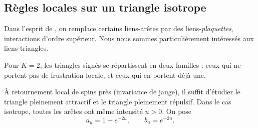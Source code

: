 


\subsection{Règles locales sur un triangle isotrope}

Dans l'esprit de \KBD{} \cite{KBD1992}, on remplace certains liens-arêtes par des liens-\emph{plaquettes}, interactions d'ordre supérieur. 
Nous nous sommes particulièrement intéressés aux liens-triangles.

Pour $K=2$, les triangles signés se répartissent en deux familles : ceux qui ne portent pas de frustration locale, et ceux qui en portent déjà une. 

À retournement local de spins près (invariance de jauge), il suffit d'étudier le triangle pleinement attractif et le triangle pleinement répulsif. 
Dans le cas isotrope, toutes les arêtes ont même intensité $u>0$. On pose
\begin{equation}
    a_u=1-e^{-2u},
    \qquad
    b_u=e^{-2u}.
    \label{eq:chapII_triangle_ab}
\end{equation}

